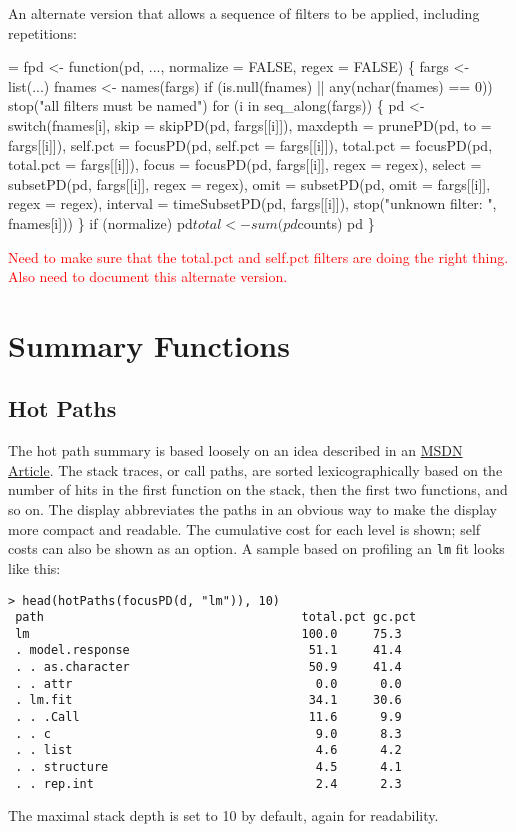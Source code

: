 \documentclass[11pt]{article}
\newcommand{\FIXME}[1]{\textcolor{red}{#1}}
\begin{document}
An alternate version that allows a sequence of filters to be applied,
including repetitions:
\begin{nwchunk}
=
 fpd <- function(pd, ..., normalize = FALSE, regex = FALSE)
 \{
     fargs <- list(...)
     fnames <- names(fargs)
     if (is.null(fnames) || any(nchar(fnames) == 0))
         stop("all filters must be named")
     for (i in seq_along(fargs)) \{
         pd <- switch(fnames[i],
                      skip = skipPD(pd, fargs[[i]]),
                      maxdepth = prunePD(pd, to = fargs[[i]]),
                      self.pct = focusPD(pd, self.pct = fargs[[i]]),
                      total.pct = focusPD(pd, total.pct = fargs[[i]]),
                      focus = focusPD(pd, fargs[[i]], regex = regex),
                      select = subsetPD(pd, fargs[[i]], regex = regex),
                      omit = subsetPD(pd, omit = fargs[[i]], regex = regex),
                      interval = timeSubsetPD(pd, fargs[[i]]),
                      stop("unknown filter: ", fnames[i]))
     \}
     if (normalize) 
         pd$total <- sum(pd$counts)
     pd
 \}
\end{nwchunk}
\FIXME{Need to make sure that the total.pct and self.pct filters are
doing the right thing. Also need to document this alternate version.}


\section{Summary Functions}
\subsection{Hot Paths}
The hot path summary is based loosely on an idea described in an
\href{http://msdn.microsoft.com/en-us/magazine/cc337887.aspx}{MSDN
  Article}. The stack traces, or call paths, are sorted
lexicographically based on the number of hits in the first function on
the stack, then the first two functions, and so on.  The display
abbreviates the paths in an obvious way to make the display more
compact and readable. The cumulative cost for each level is shown;
self costs can also be shown as an option. A sample based on profiling
an \Verb!lm! fit looks like this:
\begin{verbatim}
> head(hotPaths(focusPD(d, "lm")), 10)
 path                                    total.pct gc.pct
 lm                                      100.0     75.3  
 . model.response                         51.1     41.4  
 . . as.character                         50.9     41.4  
 . . attr                                  0.0      0.0  
 . lm.fit                                 34.1     30.6  
 . . .Call                                11.6      9.9  
 . . c                                     9.0      8.3  
 . . list                                  4.6      4.2  
 . . structure                             4.5      4.1  
 . . rep.int                               2.4      2.3  
\end{verbatim}
The maximal stack depth is set to 10 by default, again for
readability.
\end{document}

